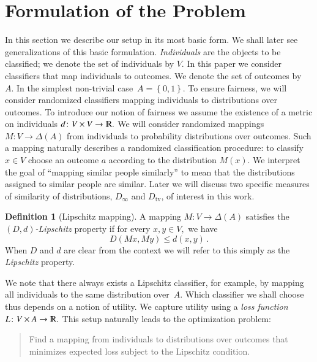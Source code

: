 \documentclass[letterpaper,11pt]{article}
\theoremstyle{definition}
\newtheorem{definition}{Definition}[section]
\newcommand{\remove}[1]{}
\renewcommand{\mathbb}{\varmathbb}
\newcommand{\Psymb}{\mathbb{P}}
\DeclareMathOperator*{\ProbOp}{\Psymb r}
\renewcommand{\Pr}{\ProbOp}
\newcommand{\mper}{\,.}
\newcommand{\R}{\mathbb{R}}
\newcommand{\bits}{\left\{0,1\right\}}
\newcommand{\tv}{\mathrm{tv}}
\newcommand\dtoD{D,d}
\begin{document}
\section{Formulation of the Problem}
\label{sec:formulation}

In this section we describe our setup in its most basic form. We shall later
see generalizations of this basic formulation.
{\em Individuals} are the objects to be classified; we denote the set of
individuals by $V$.
In this paper we consider classifiers that map individuals
to outcomes. We denote the set of outcomes by~$A.$ In the simplest
non-trivial case~$A=\bits.$ To ensure fairness, we will consider randomized
classifiers mapping individuals to distributions over outcomes.
%
To introduce our notion of fairness we assume the existence of a
metric on individuals $d\colon V\times V\to\mathbb{R}.$
%
We will consider randomized mappings $M\colon V\to \Delta(A)$
from individuals to probability distributions
over outcomes. Such a mapping naturally describes a randomized classification
procedure: to classify $x \in V$ choose an outcome
$a$ according to the distribution $M(x)$.
We interpret the goal of ``mapping similar people similarly''
to mean that the distributions assigned to similar people are similar.
Later we will discuss two specific measures of similarity of 
distributions, $D_\infty$ and $D_\tv$,
of interest in this work.
\begin{definition}[Lipschitz mapping]
\label{def:Lipschitz-map}
A mapping $M\colon V\to\Delta(A)$ satisfies the \emph{$(\dtoD)$-Lipschitz}
property if for every $x,y\in V,$ we have
\begin{equation}\label{eq:lipschitz}
D(Mx,My)\le d(x,y)\mper
\end{equation}
When $D$ and $d$ are clear from the context we will refer to this
simply as the \emph{Lipschitz} property. 
\end{definition}
\remove{
\begin{definition}\label{def:Lipschitz}
Let $D$ be a distance measure between distributions.
A randomized mapping $F\colon V\to A$ satisfies the \emph{$d$-Lipschitz}
property if for every two individuals $x,y\in V$ and every set of outcomes
$O\subseteq A,$
\[
\frac{\Pr\{F(x)\in O\}}{\Pr\{F(y)\in O\}}
\le \exp(d(x,y))\mper
\]
\end{definition}
}
%
\remove{
We think of two individuals $x,y$ as similar if $d(x,y)\ll 1.$ In this case,
the above condition ensures that $x$ and $y$ map to similar distributions
over~$A.$ On the other hand, when $x,y$ are very dissimilar, i.e., $d(x,y)\gg
1,$ the condition imposes only a weak constraint on the two corresponding
distributions over outcomes.
}
We note that there always exists a Lipschitz classifier, for example, by
mapping all individuals to the same distribution over~$A.$ Which classifier we
shall choose thus depends on a notion of utility. We capture utility using a
\emph{loss function}~$L\colon V\times A\to\R.$ This setup naturally leads
to the optimization problem:
\begin{quote}
Find a mapping from individuals to distributions over outcomes
that minimizes expected loss subject to the Lipschitz condition.
\end{quote}
\end{document}
